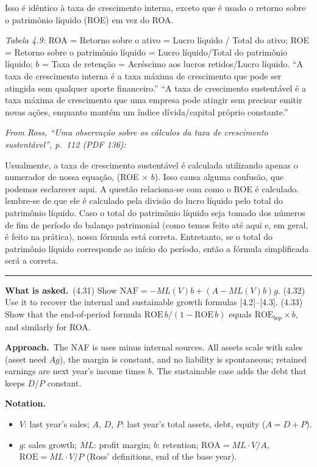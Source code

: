 \documentclass[11pt,a4paper]{article}
\newcommand{\notation}{\par\noindent\textbf{Notation.}}
\newcommand{\asked}{\par\medskip\noindent\textbf{What is asked.}~}
\newcommand{\approach}{\par\smallskip\noindent\textbf{Approach.}~}
\newcommand{\stmtend}{\par\endgroup\nopagebreak\noindent\rule{\linewidth}{0.4pt}\par\medskip}
\begin{document}
Isso é idêntico à taxa de crescimento interna, exceto que é usado o retorno sobre o patrimônio
líquido (ROE) em vez do ROA.

\emph{Tabela 4.9:} ROA = Retorno sobre o ativo = Lucro líquido / Total do ativo; ROE = Retorno sobre
o patrimônio líquido = Lucro líquido/Total do patrimônio líquido; \(b\) = Taxa de retenção =
Acréscimo aos lucros retidos/Lucro líquido. ``A taxa de crescimento interna é a taxa máxima de
crescimento que pode ser atingida sem qualquer aporte financeiro.'' ``A taxa de crescimento
sustentável é a taxa máxima de crescimento que uma empresa pode atingir sem precisar emitir novas
ações, enquanto mantém um índice dívida/capital próprio constante.''

\emph{From Ross, ``Uma observação sobre os cálculos da taxa de crescimento sustentável'', p.~112
(PDF 136):}

Usualmente, a taxa de crescimento sustentável é calculada utilizando apenas o numerador de nossa
equação, (ROE × \(b\)). Isso causa alguma confusão, que podemos esclarecer aqui. A questão
relaciona-se com como o ROE é calculado. lembre-se de que ele é calculado pela divisão do lucro
líquido pelo total do patrimônio líquido. Caso o total do patrimônio líquido seja tomado dos números
de fim de período do balanço patrimonial (como temos feito até aqui e, em geral, é feito na
prática), nossa fórmula está correta. Entretanto, se o total do patrimônio líquido corresponde ao
início do período, então a fórmula simplificada será a correta.
\stmtend

\asked (4.31) Show $\text{NAF}=-ML(V)b+(A-ML(V)b)g$. (4.32) Use it to recover the internal and
sustainable growth formulas [4.2]--[4.3]. (4.33) Show that the end-of-period formula
$\text{ROE}\,b/(1-\text{ROE}\,b)$ equals $\text{ROE}_{bop}\times b$, and similarly for ROA.

\approach The NAF is uses minus internal sources. All assets scale with sales (asset need $Ag$), the
margin is constant, and no liability is spontaneous; retained earnings are next year's income times $b$.
The sustainable case adds the debt that keeps $D/P$ constant.

\notation
\begin{itemize}
  \item $V$: last year's sales; $A$, $D$, $P$: last year's total assets, debt, equity ($A=D+P$).
  \item $g$: sales growth; $ML$: profit margin; $b$: retention; $\text{ROA}=ML\cdot V/A$, $\text{ROE}=ML\cdot V/P$
        (Ross' definitions, end of the base year).
\end{itemize}
\end{document}
